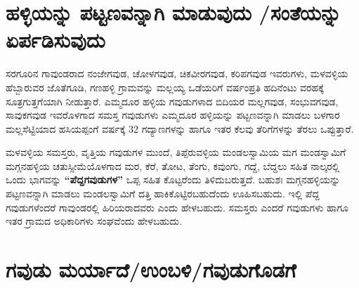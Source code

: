 \section{ಹಳ್ಳಿಯನ್ನು ಪಟ್ಟಣವನ್ನಾಗಿ ಮಾಡುವುದು /ಸಂತೆಯನ್ನು ಏರ್ಪಡಿಸುವುದು}

\vskip 2pt

ಸರಗೂರಿನ ಗಾವುಂಡರಾದ ನಂಜೇಗವುಡ, ಚೋಳಗವುಡ, ಚಿಕವೀರಗವುಡ, ಕರಿಪಗವುಡ ಇವರುಗಳು, ಮಳವಳ್ಳಿಯ ಹೆಬ್ಬಾರುವರ ಜೊತೆಗೂಡಿ, ಗಣಹಳ್ಳಿ ಗ್ರಾಮವನ್ನು ಮಲ್ಲಯ್ಯ ಒಡೆಯರಿಗೆ ವರ್ಷಂಪ್ರತಿ ಹದಿನೆಂಟು ವರಹಕ್ಕೆ ಸೂತ್ರಗುತ್ತಗೆ\-ಯಾಗಿ ನೀಡುತ್ತಾರೆ. ಎಮ್ಮದೂರ ಹಳ್ಳಿಯ ಗವುಡುಗಳಾದ ಬಿದಿಯರ ಮಲ್ಲಗವುಡ, ಸಂಭುವಗವುಡ, ಸಾವುಕಗವುಡ ಇವರೊಳಗಾದ ಸಮಸ್ತ ಗವುಡುಗಳು ಎಮ್ಮದೂರ ಹಳ್ಳಿಯನ್ನು ಪಟ್ಟಣವನ್ನಾಗಿ ಮಾಡಲು ಬಳಗಾರ ಮಲ್ಲಸೆಟ್ಟಿಯಾದ ಹಸಿಯಪ್ಪಂಗೆ ವರ್ಷಕ್ಕೆ 32 ಗದ್ಯಾಣಗಳನ್ನು ಹಾಗೂ ಇತರ ಕೆಲವು ತೆರಿಗೆಗಳನ್ನು ತೆರಲು ಒಪ್ಪುತ್ತಾರೆ.

\vskip 2pt

ಮಳವಳ್ಳಿಯ ಸಮಸ್ತರು, ವೃತ್ತಿಯ ಗವುಡುಗಳ ಮುಂದೆ, ತಿಪ್ಪೆರುವಳ್ಳಿಯ ಮಂಡಲಸ್ವಾಮಿಯ ಮಗ ಮಂಡಸ್ವಾಮಿಗೆ ಮಗ್ಗನಹಳ್ಳಿಯ ಚತುಸ್ಸೀಮೆಯೊಳಗಾದ ಮರ, ಕೆರೆ, ತೋಟ, ತೆಂಗು, ಕವುಂಗು, ಗದ್ದೆ, ಬೆದ್ದಲು ಸಹಿತ ನಾಲ್ಕರಲ್ಲಿ ಒಂದು ಭಾಗವನ್ನು \textbf{“ಪೆದ್ದಗವುಡುಗಳ”} ಒಪ್ಪ ಸಹಿತ ಕೊಟ್ಟರೆಂದು ತಿಳಿದುಬರುತ್ತದೆ. ಬಹುಶಃ ಮಗ್ಗನಹಳ್ಳಿಯನ್ನು ಪಟ್ಟಣವನ್ನಾಗಿ ಮಾಡಲು ಮಂಡಲಸ್ವಾಮಿಗೆ ದತ್ತಿ ಹಾಕಿಕೊಟ್ಟಿರಬಹುದೆಂದು ಊಹಿಸಬಹುದು. ಇಲ್ಲಿ ಪೆದ್ದ ಗವುಡುಗಳೆಂದರೆ ಗಾವುಂಡರಲ್ಲಿ ಹಿರಿಯರಾದವರು ಎಂದು ಹೇಳಬಹುದು. ಸಮಸ್ತರು ಎಂದರೆ ಗವುಡುಗಳು ಹಾಗೂ ಇತರ ಗ್ರಾಮದ ಅಧಿಕಾರಿಗಳು ಸಂಘ\-ವೆಂದು ಹೇಳಬಹುದು.


\section{ಗವುಡು ಮರ್ಯಾದೆ/ಉಂಬಳಿ/ಗವುಡುಗೊಡಗೆ}

